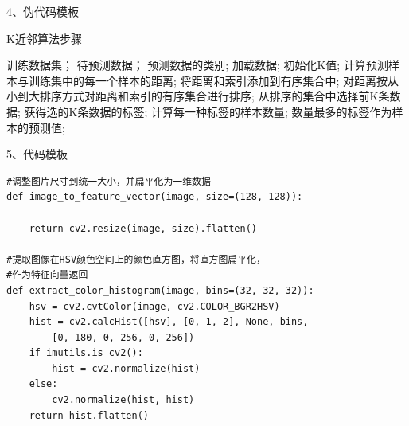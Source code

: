 \documentclass{article}
\begin{document}
\begin{appendices}
    4、伪代码模板
    \begin{algorithm}[H]
        \caption{ K近邻算法步骤}
        \begin{algorithmic}[1]
            \Require
            训练数据集；
            待预测数据；
            \Ensure
            预测数据的类别;
            \State 加载数据;
            \State 初始化K值;
            \State 计算预测样本与训练集中的每一个样本的距离;
            \State 将距离和索引添加到有序集合中;
            \State 对距离按从小到大排序方式对距离和索引的有序集合进行排序;
            \State 从排序的集合中选择前K条数据;
            \State 获得选的K条数据的标签;
            \State 计算每一种标签的样本数量;
            \Return
            数量最多的标签作为样本的预测值;
        \end{algorithmic}
    \end{algorithm}


    5、代码模板
    \lstset{language=Python}
    \begin{lstlisting}
#调整图片尺寸到统一大小，并扁平化为一维数据
def image_to_feature_vector(image, size=(128, 128)):

	return cv2.resize(image, size).flatten()

#提取图像在HSV颜色空间上的颜色直方图，将直方图扁平化，
#作为特征向量返回
def extract_color_histogram(image, bins=(32, 32, 32)):
	hsv = cv2.cvtColor(image, cv2.COLOR_BGR2HSV)
	hist = cv2.calcHist([hsv], [0, 1, 2], None, bins,
		[0, 180, 0, 256, 0, 256])
	if imutils.is_cv2():
		hist = cv2.normalize(hist)
	else:
		cv2.normalize(hist, hist)
	return hist.flatten()

\end{lstlisting}
\end{appendices}
\end{document}
